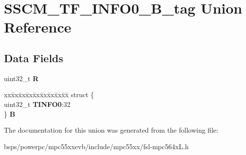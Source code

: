 \hypertarget{unionSSCM__TF__INFO0__32B__tag}{}\section{S\+S\+C\+M\+\_\+\+T\+F\+\_\+\+I\+N\+F\+O0\+\_\+B\+\_\+tag Union Reference}
\label{unionSSCM__TF__INFO0__32B__tag}
\subsection*{Data Fields}
\begin{DoxyCompactItemize}
\item 
\mbox{\label{unionSSCM__TF__INFO0__32B__tag_a803ec055acb5bc9ef07caa5718fc175e}} 
uint32\+\_\+t {\bfseries R}
\item 
\mbox{\label{unionSSCM__TF__INFO0__32B__tag_a2fb5dba4df10a139a0cff7aaec7f654b}} 
\begin{tabbing}
xx\=xx\=xx\=xx\=xx\=xx\=xx\=xx\=xx\=\kill
struct \{\\
\>uint32\_t {\bfseries TINFO0}:32\\
\} {\bfseries B}\\

\end{tabbing}\end{DoxyCompactItemize}


The documentation for this union was generated from the following file\+:\begin{DoxyCompactItemize}
\item 
bsps/powerpc/mpc55xxevb/include/mpc55xx/fsl-\/mpc564x\+L.\+h\end{DoxyCompactItemize}
